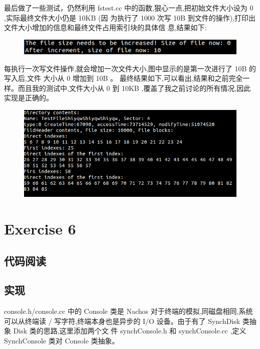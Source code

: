 \documentclass[nofonts]{ctexart}
\begin{document}
最后做了一些测试，仍然利用 fstest.cc 中的函数,狠心一点,把初始文件大小设为 0 ,实际最终文件大小仍是 10KB (因
为执行了 1000 次写 10B 到文件的操作),打印出文件大小增加的信息和最终文件占用索引块的具体信
息,结果如下:
\begin{figure}[h!]
\includegraphics[width=5in]{e51.png}
\end{figure}
每执行一次写文件操作,就会增加一次文件大小,图中显示的是第一次进行了 10B 的写入后,文件
大小从 0 增加到 10B 。
最终结果如下,可以看出,结果和之前完全一样。而且我的测试中,文件大小从 0 到 10KB ,覆盖了我之前讨论的所有情况,因此实现是正确的。
\begin{figure}[h!]
\includegraphics[width=5in]{e52.png}
\end{figure}

\section*{Exercise 6}
\subsection*{代码阅读}
\subsection*{实现}
console.h/console.cc 中的 Console 类是 Nachos 对于终端的模拟,同磁盘相同,系统可以从终端读
/ 写字符,终端本身也是异步的 I/O 设备。由于有了 SynchDisk 类抽象 Disk 类的思路,这里添加两个文
件 synchConsole.h 和 synchConsole.cc ,定义 SynchConsole 类对 Console 类抽象。
\end{document}
